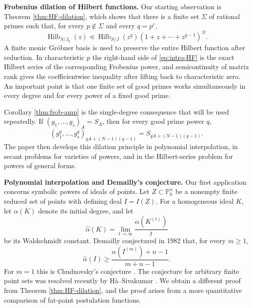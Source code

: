 \documentclass[11pt]{amsart}
\theoremstyle{remark}
\newcommand{\PP}{\mathbb P}
\newcommand{\kk}{\Bbbk}
\newcommand{\Hilb}{\operatorname{Hilb}}
\begin{document}
\medskip
\noindent\textbf{Frobenius dilation of Hilbert functions.}
Our starting observation is Theorem \ref{thm:HF-dilation}, which shows that there is a finite set $\Sigma$ of rational primes such that, for every $p\notin\Sigma$ and every $q=p^e$,
\begin{equation}\label{eq:intro-HF}
\Hilb_{S/J_q}(z)
\preceq
\Hilb_{S/J}(z^q)(1+z+\cdots+z^{q-1})^N.
\end{equation}
A finite monic Gr\"obner basis is used to preserve the entire Hilbert function after reduction. In characteristic $p$ the right-hand side of \eqref{eq:intro-HF} is the exact Hilbert series of the corresponding Frobenius power, and semicontinuity of matrix rank gives the coefficientwise inequality after lifting back to characteristic zero. An important point is that one finite set of good primes works simultaneously in every degree and for every power of a fixed good prime.

Corollary \ref{thm:frob-amp} is the single-degree consequence that will be used repeatedly. If $(g_1,\ldots,g_s)_A=S_A$, then for every good prime power $q$,
$$
(g_1^q,\ldots,g_s^q)_{qA+(N-1)(q-1)}
=
S_{qA+(N-1)(q-1)}.
$$
The paper then develops this dilation principle in polynomial interpolation, in secant problems for varieties of powers, and in the Hilbert-series problem for powers of general forms.

\medskip
\noindent\textbf{Polynomial interpolation and Demailly's conjecture.}
Our first application concerns symbolic powers of ideals of points. Let $Z\subset\PP_\kk^n$ be a nonempty finite reduced set of points with defining deal $I=I(Z)$. For a homogeneous ideal $K$, let $\alpha(K)$ denote its initial degree, and let
$$
\widehat\alpha(K)
=
\lim_{t\to\infty}\frac{\alpha(K^{(t)})}{t}
$$
be its Waldschmidt constant. Demailly \cite{Demailly} conjectured in 1982 that, for every $m\ge1$,
\begin{equation}\label{eq:intro-Demailly}
\widehat\alpha(I)
\ge
\frac{\alpha(I^{(m)})+n-1}{m+n-1}.
\end{equation}
For $m=1$ this is Chudnovsky's conjecture \cite{Chudnovsky}. The conjecture for arbitrary finite point sets was resolved recently by H\`a--Sivakumar \cite[Theorem~1.2]{HaSivakumar}. We obtain a different proof from Theorem \ref{thm:HF-dilation}, and the proof arises from a more quantitative comparison of fat-point postulation functions.
\end{document}
